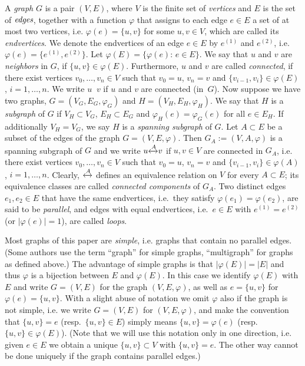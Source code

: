 \documentclass{dis}
\theoremstyle{citing}
\begin{document}
A 
\emph{graph}
$G$ is a pair $(V,E)$, where $V$ is the 
finite set of \emph{vertices} and $E$ is the set of $\emph{edges}$, 
together with a function $\varphi$ that assigns to each edge 
$e\in E$ a set of at most two vertices, i.e. $\varphi(e)=\{u,v\}$ 
for some $u,v\in V$, which are called its 
\emph{endvertices}. 
We denote the endvertices of an edge $e\in E$ by 
$e^{(1)}$ and $e^{(2)}$, i.e. $\varphi(e)=\{e^{(1)}, e^{(2)}\}$. 
Let $\varphi(E)=\{\varphi(e):\, e\in E \}$. 
We say that $u$ and $v$ are \emph{neighbors} in $G$, 
if $\{u,v\}\in \varphi(E)$.
Furthermore, $u$ and $v$ are called 
\emph{connected}, if there exist vertices 
$v_0,\dots,v_n\in V$ 
such that $v_0=u$, $v_n=v$ and $\{v_{i-1},v_i\}\in\varphi(E)$, 
$i=1,\dots,n$. We write $u{\mathop{\stackrel{{}}{\leftrightarrow}}} v$ if $u$ and $v$ 
are connected (in~$G$). 
Now suppose we have two graphs, $G=(V_G,E_G,\varphi_G)$ and 
$H=(V_H, E_H, \varphi_H)$. We say that $H$ is a 
\emph{subgraph} 
of $G$ if $V_H\subset V_G$, $E_H\subset E_G$ and 
$\varphi_H(e)=\varphi_G(e)$ for all $e\in E_H$. 
If additionally $V_H=V_G$, we say $H$ is a 
\emph{spanning subgraph} 
of $G$.
Let $A\subset E$ be a subset of the edges of the graph 
$G=(V,E,\varphi)$. 
Then $G_A:=(V,A,\varphi)$ is a spanning subgraph of $G$ 
and we write $u{\xleftrightarrow{{A}}}v$ if $u,v\in V$ are connected 
in $G_{A}$, i.e. there exist vertices $v_0,\dots,v_n\in V$ 
such that $v_0=u$, $v_n=v$ and $\{v_{i-1},v_i\}\in\varphi(A)$, 
$i=1,\dots,n$.
Clearly, ${\xleftrightarrow{{A}}}$ defines an 
equivalence relation on $V$ for every $A\subset E$; its 
equivalence classes are called 
\emph{connected components} of $G_A$.
Two distinct edges $e_1, e_2\in E$ that have the same endvertices, 
i.e.~they satisfy $\varphi(e_1)=\varphi(e_2)$, are said to be  
\emph{parallel}, and edges with equal 
endvertices, i.e.~$e\in E$ with $e^{(1)}= e^{(2)}$ 
(or ${\left\vert {\varphi(e)} \right\vert}=1$), 
are called \emph{loops}.

Most graphs of this paper are 
\emph{simple}, i.e. 
graphs that contain no parallel edges.
(Some authors use the term ``graph'' for simple graphs, 
``multigraph'' for graphs as defined above.)
The advantage of simple graphs is that 
${\left\vert {\varphi(E)} \right\vert}={\left\vert {E} \right\vert}$ and thus $\varphi$ is a 
bijection between $E$ and $\varphi(E)$. 
In this case we identify $\varphi(E)$ with $E$ and 
write $G=(V,E)$ for the graph $(V,E,\varphi)$, as well as 
$e=\{u,v\}$ for $\varphi(e)=\{u,v\}$.
With a slight abuse of notation we omit $\varphi$ also if the 
graph is not simple, i.e. we write $G=(V,E)$ for $(V,E,\varphi)$, 
and make the convention that 
$\{u,v\}=e$ 
(resp.~$\{u,v\}\in E$) 
simply means 
$\{u,v\}=\varphi(e)$ 
(resp.~$\{u,v\}\in \varphi(E)$). 
(Note that we will use this notation only in one direction, 
i.e. given $e\in E$ we obtain a unique $\{u,v\}\subset V$ 
with $\{u,v\}=e$. 
The other way cannot be done uniquely if the graph contains 
parallel edges.)
\end{document}
